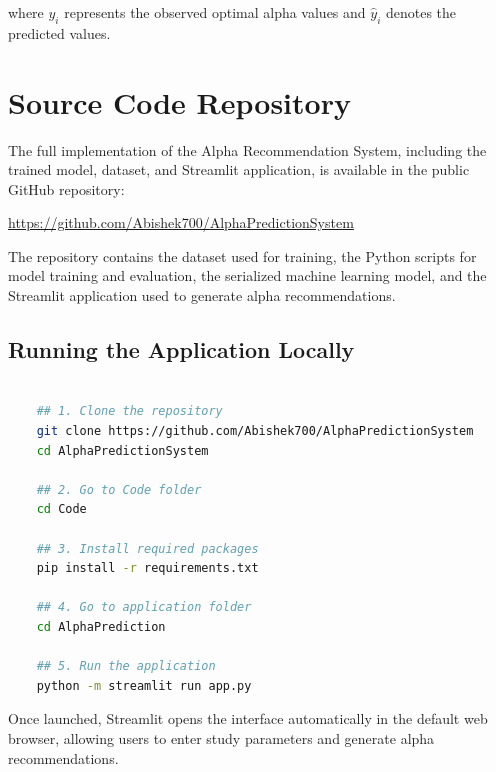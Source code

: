 where $y_i$ represents the observed optimal alpha values and
$\hat{y}_i$ denotes the predicted values.


\section{Source Code Repository}
\label{sec:gitappendix}
The full implementation of the Alpha Recommendation System,
including the trained model, dataset, and Streamlit application,
is available in the public GitHub repository:

\url{https://github.com/Abishek700/AlphaPredictionSystem}

The repository contains the dataset used for training, the Python
scripts for model training and evaluation, the serialized machine
learning model, and the Streamlit application used to generate
alpha recommendations.

\subsection{Running the Application Locally}

\begin{lstlisting}[language=bash]
	
	## 1. Clone the repository
	git clone https://github.com/Abishek700/AlphaPredictionSystem
	cd AlphaPredictionSystem
	
    ## 2. Go to Code folder
    cd Code
    
    ## 3. Install required packages
    pip install -r requirements.txt

    ## 4. Go to application folder
    cd AlphaPrediction

    ## 5. Run the application
    python -m streamlit run app.py

\end{lstlisting}

Once launched, Streamlit opens the interface automatically in the
default web browser, allowing users to enter study parameters and
generate alpha recommendations.